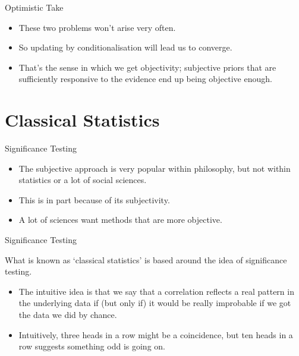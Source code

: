 \documentclass[
  ignorenonframetext,
]{beamer}
\providecommand{\tightlist}{%
  \setlength{\itemsep}{0pt}\setlength{\parskip}{0pt}}
\renewcommand{\,}{\text{, }}
\begin{document}
\begin{frame}{Optimistic Take}
\protect\hypertarget{optimistic-take-1}{}

\begin{itemize}
\tightlist
\item
  These two problems won't arise very often.
\item
  So updating by conditionalisation will lead us to converge.
\item
  That's the sense in which we get objectivity; subjective priors that
  are sufficiently responsive to the evidence end up being objective
  enough.
\end{itemize}

\end{frame}

\hypertarget{classical-statistics}{%
\section{Classical Statistics}\label{classical-statistics}}

\begin{frame}{Significance Testing}
\protect\hypertarget{significance-testing}{}

\begin{itemize}
\tightlist
\item
  The subjective approach is very popular within philosophy, but not
  within statistics or a lot of social sciences.
\item
  This is in part because of its subjectivity.
\item
  A lot of sciences want methods that are more objective.
\end{itemize}

\end{frame}

\begin{frame}{Significance Testing}
\protect\hypertarget{significance-testing-1}{}

What is known as `classical statistics' is based around the idea of
significance testing.

\begin{itemize}
\tightlist
\item
  The intuitive idea is that we say that a correlation reflects a real
  pattern in the underlying data if (but only if) it would be really
  improbable if we got the data we did by chance.
\item
  Intuitively, three heads in a row might be a coincidence, but ten
  heads in a row suggests something odd is going on.
\end{itemize}

\end{frame}
\end{document}
